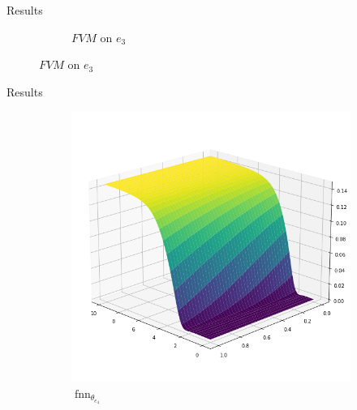 \documentclass[9pt]{beamer}
\begin{document}
\begin{frame}{Results}
\begin{figure}[H]
\begin{center}
\begin{subfigure}[b]{0.4\textwidth}
\begin{center}
                \end{center}
                \caption{$FVM$ on $e_3$}
            \end{subfigure}
        \end{center}
    \end{figure}
\end{frame}



\begin{frame}{Results}
    \begin{figure}[H]
        \begin{center}
            \begin{subfigure}[b]{0.4\textwidth}
                \begin{center}
                    \includegraphics[scale=0.25]{img/Kante4.png}
                \end{center}
                \caption{$\operatorname{fnn}_{\theta_{e_4}}$}
            \end{subfigure} \hspace{10mm}
            \begin{subfigure}[b]{0.4\textwidth}
                \begin{center}

\end{center}
\end{subfigure}
\end{center}
\end{figure}
\end{frame}
\end{document}
